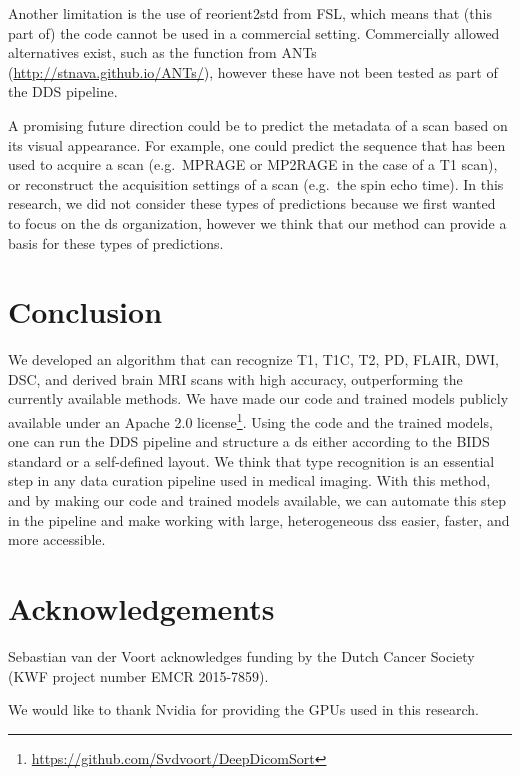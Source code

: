 Another limitation is the use of reorient2std from FSL, which means that (this part of) the code cannot be used in a commercial setting.
Commercially allowed alternatives exist, such as the  function from ANTs (\url{http://stnava.github.io/ANTs/}), however these have not been tested as part of the \gls{DDS} pipeline.

A promising future direction could be to predict the metadata of a \gls{scan} based on its visual appearance.
For example, one could predict the sequence that has been used to acquire a \gls{scan} (e.g.\ MPRAGE or MP2RAGE in the case of a \gls{T1} \gls{scan}), or reconstruct the acquisition settings of a \gls{scan} (e.g.\ the spin echo time).
In this research, we did not consider these types of predictions because we first wanted to focus on the \gls{ds} organization, however we think that our method can provide a basis for these types of predictions.

\section{Conclusion}

We developed an algorithm that can recognize \gls{T1}, \gls{T1C}, \gls{T2}, \gls{PD}, \gls{FLAIR}, \gls{DWI}, \gls{DSC}, and derived brain \gls{MRI} \glspl{scan} with high accuracy, outperforming the currently available methods.
We have made our code and trained models publicly available under an Apache 2.0 license\footnote{\url{https://github.com/Svdvoort/DeepDicomSort}}.
Using the code and the trained models, one can run the \gls{DDS} pipeline and structure a \gls{ds} either according to the \gls{BIDS} standard or a self-defined layout.
We think that \gls{type} recognition is an essential step in any data curation pipeline used in medical imaging.
With this method, and by making our code and trained models available, we can automate this step in the pipeline and make working with large, heterogeneous \glspl{ds} easier, faster, and more accessible.

\section*{Acknowledgements}

Sebastian van der Voort acknowledges funding by the Dutch Cancer Society (KWF project number EMCR 2015-7859).

We would like to thank Nvidia for providing the GPUs used in this research.

